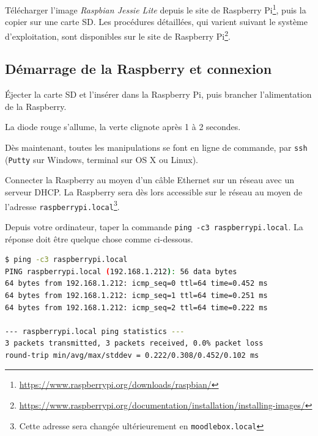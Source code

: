\documentclass[11pt]{article}
\begin{document}
Télécharger l'image \emph{Raspbian Jessie Lite} depuis le site de Raspberry Pi\footnote{\url{https://www.raspberrypi.org/downloads/raspbian/}}, puis la copier sur une carte SD. Les procédures détaillées, qui varient suivant le système d'exploitation, sont disponibles sur le site de Raspberry Pi\footnote{\url{https://www.raspberrypi.org/documentation/installation/installing-images/}}.

\subsection{Démarrage de la Raspberry et connexion}

Éjecter la carte SD et l'insérer dans la Raspberry Pi, puis brancher l'alimentation de la Raspberry.

\begin{verification}
La diode rouge s'allume, la verte clignote après 1 à 2 secondes.
\end{verification}


Dès maintenant, toutes les manipulations se font en ligne de commande, par \lstinline{ssh} (\lstinline{Putty} sur Windows, terminal sur OS X ou Linux).

Connecter la Raspberry au moyen d'un câble Ethernet sur un réseau avec un serveur DHCP. La Raspberry sera dès lors accessible sur le réseau au moyen de l'adresse \lstinline{raspberrypi.local}\footnote{Cette adresse sera changée ultérieurement en \lstinline{moodlebox.local}}.

\begin{verification}
Depuis votre ordinateur, taper la commande \lstinline{ping -c3 raspberrypi.local}. La réponse doit être quelque chose comme ci-dessous.

\begin{lstlisting}[language=bash]
$ ping -c3 raspberrypi.local
PING raspberrypi.local (192.168.1.212): 56 data bytes
64 bytes from 192.168.1.212: icmp_seq=0 ttl=64 time=0.452 ms
64 bytes from 192.168.1.212: icmp_seq=1 ttl=64 time=0.251 ms
64 bytes from 192.168.1.212: icmp_seq=2 ttl=64 time=0.222 ms

--- raspberrypi.local ping statistics ---
3 packets transmitted, 3 packets received, 0.0% packet loss
round-trip min/avg/max/stddev = 0.222/0.308/0.452/0.102 ms
\end{lstlisting}
\end{verification}
\end{document}
